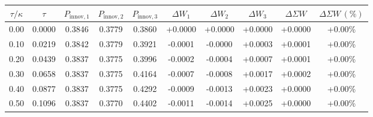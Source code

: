 \begin{tabular}{cccccccccc}
\toprule
$\tau/\widehat{\kappa}$ & $\tau$ &
$P_{\text{innov},1}$ & $P_{\text{innov},2}$ & $P_{\text{innov},3}$ &
$\Delta W_1$ & $\Delta W_2$ & $\Delta W_3$ &
$\Delta \Sigma W$ & $\Delta \Sigma W\,(\%)$ \\
\midrule
0.00 & 0.0000 & 0.3846 & 0.3779 & 0.3860 & +0.0000 & +0.0000 & +0.0000 & +0.0000 & +0.00\% \\
0.10 & 0.0219 & 0.3842 & 0.3779 & 0.3921 & -0.0001 & -0.0000 & +0.0003 & +0.0001 & +0.00\% \\
0.20 & 0.0439 & 0.3837 & 0.3775 & 0.3996 & -0.0002 & -0.0004 & +0.0007 & +0.0001 & +0.00\% \\
0.30 & 0.0658 & 0.3837 & 0.3775 & 0.4164 & -0.0007 & -0.0008 & +0.0017 & +0.0002 & +0.00\% \\
0.40 & 0.0877 & 0.3837 & 0.3775 & 0.4292 & -0.0009 & -0.0013 & +0.0023 & +0.0000 & +0.00\% \\
0.50 & 0.1096 & 0.3837 & 0.3770 & 0.4402 & -0.0011 & -0.0014 & +0.0025 & +0.0000 & +0.00\% \\
\bottomrule
\end{tabular}
